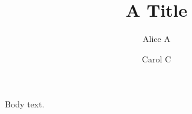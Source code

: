 \documentclass{article}
\begin{document}
\title{A Title}
\author[1]{Alice A}
\makeatletter\g@addto@macro{}\makeatother
\author[2]{Carol C}
\maketitle
Body text.
\end{document}
